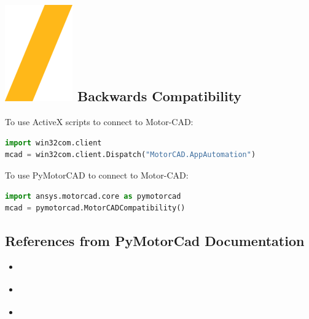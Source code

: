\documentclass[landscape]{article}
\begin{document}
\begin{multicols}{3}
\section{\includegraphics[height=\fontcharht\font`\S]{slash.png} Backwards Compatibility}
To use ActiveX scripts to connect to Motor-CAD:
\begin{lstlisting}[language=Python]
import win32com.client
mcad = win32com.client.Dispatch("MotorCAD.AppAutomation")
\end{lstlisting}
To use PyMotorCAD to connect to Motor-CAD:
\begin{lstlisting}[language=Python]
import ansys.motorcad.core as pymotorcad
mcad = pymotorcad.MotorCADCompatibility()
\end{lstlisting}	
\subsection{References from PyMotorCad Documentation}
\begin{center}
\begin{itemize}
\item \href{https://motorcad.docs.pyansys.com/version/stable/getting_started/index.html}{\color{blue}{Getting Started}}
\item \href{https://motorcad.docs.pyansys.com/version/stable/examples/index.html}{\color{blue}{Examples}}
\item \href{https://motorcad.docs.pyansys.com/version/stable/methods/index.html}{\color{blue}{API Reference}}
\end{itemize}

\end{center}
\end{multicols}
\noindent\makebox[\linewidth]{\rule{\paperwidth}{4pt}}
\end{document}
